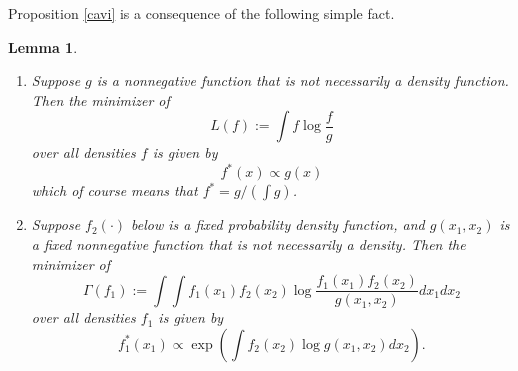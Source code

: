 \documentclass{scrartcl}
\newtheorem{lemma}[theorem]{Lemma}
\begin{document}
Proposition \ref{cavi} is a consequence of the following simple fact.

\begin{lemma}\label{klfacts}
  \begin{enumerate}
  \item Suppose $g$ is a nonnegative function that is not necessarily
    a density function. Then the minimizer of 
    \begin{equation*}
 L(f) := \int f \log \frac{f}{g}
\end{equation*}
over all densities $f$ is given  by
\begin{equation}\label{klfact1}
  f^*(x) \propto g(x) 
\end{equation}
which of course means that $f^* = g/(\int g)$. 
  \item Suppose $f_2(\cdot)$ below is a fixed probability density
    function, and $g(x_1, x_2)$ is a fixed nonnegative function that
    is not 
    necessarily a density. Then the minimizer of 
    \begin{equation*}
\Gamma(f_1) := \int \int f_1(x_1) f_2(x_2) \log
\frac{f_1(x_1)f_2(x_2)}{g(x_1, x_2)} dx_1 dx_2 
    \end{equation*}
    over all densities $f_1$ is given by
    \begin{equation}\label{klfact2}
      f_1^*(x_1) \propto \exp \left( \int f_2(x_2) \log g(x_1, x_2)
        dx_2 
      \right). 
    \end{equation}
  \end{enumerate}
\end{lemma}
\end{document}
